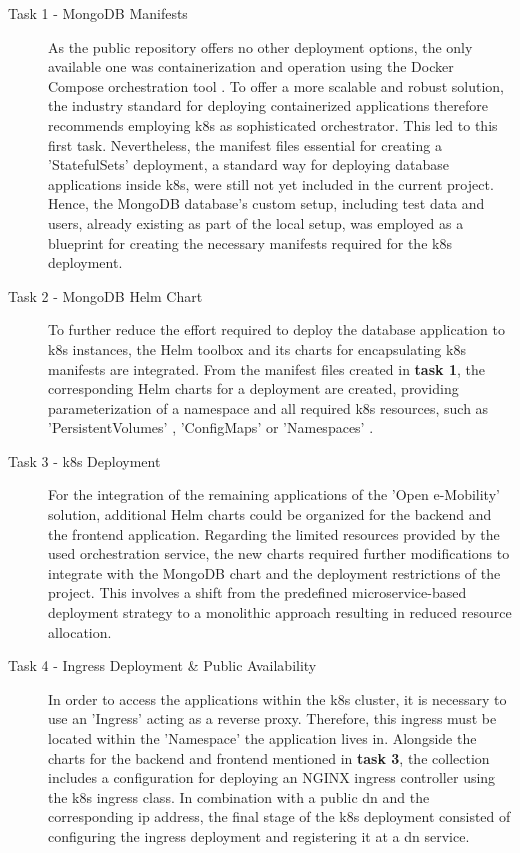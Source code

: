 \begin{description}
    \item[Task 1 - MongoDB Manifests] As the public repository offers no other deployment options, the only available one was containerization and operation using the Docker Compose orchestration tool \cite{noauthor_overview_2023}. 
    To offer a more scalable and robust solution, the industry standard for deploying containerized applications therefore recommends employing \acrshort{k8s} \cite{noauthor_produktionsreife_nodate} as sophisticated orchestrator. This led to this first task. 
    Nevertheless, the manifest files essential for creating a 'StatefulSets' \cite{noauthor_statefulsets_nodate} deployment, a standard way for deploying database applications inside \acrshort{k8s}, were still not yet included in the current project. 
    Hence, the MongoDB \cite{noauthor_mongodb_nodate} database's custom setup, including test data and users, already existing as part of the local setup, was employed as a blueprint for creating the necessary manifests required for the \acrshort{k8s} deployment.
    \item[Task 2 - MongoDB Helm Chart] To further reduce the effort required to deploy the database application to \acrshort{k8s} instances, the Helm \cite{noauthor_helm_nodate} toolbox and its charts for encapsulating \acrshort{k8s} manifests are integrated.  
    From the manifest files created in \textbf{task 1}, the corresponding Helm charts for a deployment are created, providing parameterization of a namespace and all required \acrshort{k8s} resources, such as 'PersistentVolumes' \cite{noauthor_persistent_nodate}, 'ConfigMaps' \cite{noauthor_configmaps_nodate} or 'Namespaces' \cite{noauthor_namespaces_nodate}. 
    \item[Task 3 - \acrshort{k8s} Deployment] For the integration of the remaining applications of the 'Open e-Mobility' \cite{noauthor_open_2023} solution, additional Helm charts could be organized for the backend and the frontend application. 
    Regarding the limited resources provided by the used orchestration service, the new charts required further modifications to integrate with the MongoDB chart and the deployment restrictions of the project. This involves a shift from the predefined microservice-based deployment strategy to a monolithic approach resulting in reduced resource allocation.
    \item[Task 4 - Ingress Deployment \& Public Availability] In order to access the applications within the \acrshort{k8s} cluster, it is necessary to use an 'Ingress' \cite{noauthor_ingress_nodate} acting as a reverse proxy. 
    Therefore, this ingress must be located within the 'Namespace' the application lives in.
    Alongside the charts for the backend and frontend mentioned in \textbf{task 3}, the collection includes a configuration for deploying an NGINX ingress controller \cite{noauthor_nginx_nodate} using the \acrshort{k8s} ingress class. 
    In combination with a public \acrshort{dn} and the corresponding \acrshort{ip} address, the final stage of the \acrshort{k8s} deployment consisted of configuring the ingress deployment and registering it at a \acrshort{dn} service.
\end{description}

